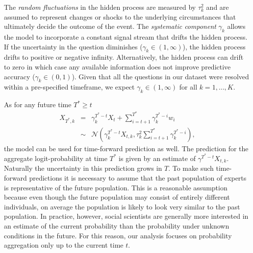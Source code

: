 \documentclass[aoas, preprint]{imsart}
\numberwithin{equation}{section}
\theoremstyle{plain}
\begin{document}
 The \textit{random fluctuations} in the hidden process are measured by $\tau^2_k$ and are assumed to represent changes or shocks to the underlying circumstances that ultimately decide the outcome of the event. The \textit{systematic component} $\gamma_k$ allows the model to incorporate a constant signal stream that drifts the hidden process. If the uncertainty in the question diminishes ($\gamma_k \in (1, \infty)$), the hidden process drifts to positive or negative infinity. Alternatively, the hidden process can drift to zero in which case any available information does not improve predictive accuracy ($\gamma_k \in (0, 1)$). Given that all the questions in our dataset were resolved within a pre-specified timeframe, we expect $\gamma_k \in (1, \infty)$ for all $k = 1, \dots, K$. 
 

As for any future time $T^{*}\geq t$
\begin{eqnarray*}
X_{T^*,k} &=&  \gamma_k^{T^*-t}X_t + \sum_{i=t+1}^{T^*} \gamma_k^{T^*-i} w_{i}\\
  &\sim& \mathcal{N}\left( \gamma_k^{T^*-t}X_{t,k}, \tau_k^2 \sum_{i=t+1}^{T^*} \gamma_k^{T^*-i}  \right),
\end{eqnarray*}
the model can be used for time-forward prediction as well. The prediction for the aggregate logit-probability at time $T^*$ is given by an estimate of $\gamma^{T^*-t}X_{t,k}$. Naturally the uncertainty in this prediction grows in $T$. To make such time-forward predictions it is necessary to assume that the past population of experts is representative of the future population. This is a reasonable assumption because even though the future population may consist of entirely different individuals, on average the population is likely to look very similar to the past population. In practice, however, social scientists are generally more interested in an estimate of the current probability  than the probability under unknown conditions in the future. For this reason, our analysis focuses on probability aggregation only up to the current time $t$.
\end{document}
